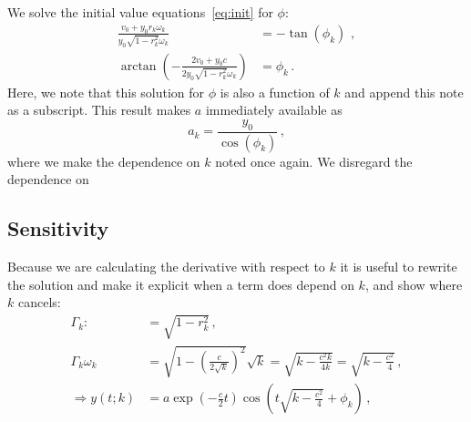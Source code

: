 \documentclass[utf8,english,DIV=12]{scrartcl}
\begin{document}
We solve the initial value equations~\eqref{eq:init} for $\phi$:
\begin{align}
    \frac{v_0 + y_0r_k\omega_k}{y_0\sqrt{1-r_k^2}\omega_k} &= - \tan(\phi_k)\,\,,\label{eq:tanphi}\\
    \arctan\left(-\frac{2v_0 + y_0{c}}{2y_0\sqrt{1-r_k^2}\omega_k}\right) &= \phi_k\,.\label{eq:phi}
\end{align}
Here, we note that this solution for $\phi$ is also a function of $k$ and append this note as a subscript. 
This result makes $a$ immediately available as
\begin{equation}
  \label{eq:a}
  a_k = \frac{y_0}{\cos(\phi_k)}\,,
\end{equation}
where we make the dependence on $k$ noted once again. We disregard the dependence on 

\subsection{Sensitivity}
\label{sec:sens}

Because we are calculating the derivative with respect to $k$ it is
useful to rewrite the solution and make it explicit when a term does
depend on $k$, and show where $k$ cancels:
\begin{equation}
  \label{eq:yk}
  \begin{split}
    \Gamma_k:&=\sqrt{1-r_k^2}\,,\\
    \Gamma_k\omega_k&=\sqrt{1-\left(\frac{c}{2\sqrt{k}}\right)^2}\sqrt{k}=\sqrt{k-\frac{c^2k}{4k}}=\sqrt{k-\frac{c^2}{4}}\,,\\
  \Rightarrow y(t;k)&=a\exp\left(-\frac{c}{2}t\right)\cos\left(t\sqrt{k-\frac{c^2}{4}}+\phi_k\right)\,,
\end{split}
\end{equation}
\end{document}
